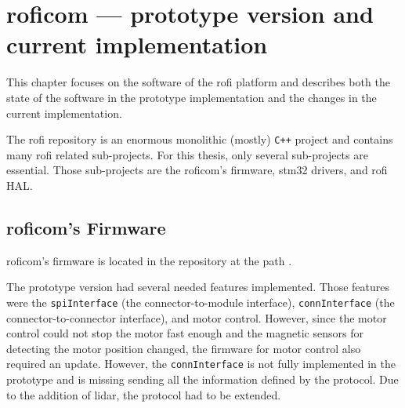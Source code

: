\documentclass[
  digital,     %
  oneside,     %
  nosansbold,  %
  nocolorbold, %
  nolof,         %
  nolot,         %
]{fithesis4}
\newcommand{\TODO}[1]{#1} %
\newcommand{\TODOLIST}[1]{}
\begin{document}
\chapter[ RoFICoM --- prototype version and current implementation ]{ \acrshort{roficom} --- prototype version and current implementation }
\TODOLIST{
\begin{itemize}
    \item Project structure/architecture
    \begin{itemize}
        \item suites
        \item Protocol
    \end{itemize}
    \item \texttt{control\_board}
    \item \texttt{stm32cxx}
    \item \texttt{rofi-hal}
\end{itemize}
}

This chapter focuses on the software of the \acrshort{rofi} platform and describes both the state of
the software in the prototype implementation and the changes in the current implementation.

The \acrshort{rofi} repository is an enormous monolithic (mostly) \verb|C++| project and contains
many \acrshort{rofi} related sub-projects. For this thesis, only several sub-projects are essential.
Those sub-projects are the \acrshort{roficom}'s firmware, stm32 drivers, and \acrshort{rofi} HAL.

\section[ RoFICoM's Firmware ]{ \acrshort{roficom}'s Firmware } \label{sec:roficom-firmware}
\acrshort{roficom}'s firmware is located in the repository at the path
.

The prototype version had several needed features implemented. Those features were the
\lstinline|spiInterface| (the connector-to-module interface), \lstinline|connInterface| (the
connector-to-connector interface), and motor control. However, since the motor control could not
stop the motor fast enough and the magnetic sensors for detecting the motor position changed, the
firmware for motor control also required an update. However, the \lstinline|connInterface| is not
fully implemented in the prototype and is missing sending all the information defined by the
protocol. Due to the addition of lidar, the protocol had to be extended.
\end{document}
